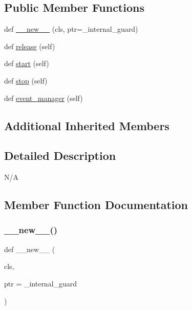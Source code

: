 \subsection*{Public Member Functions}
\begin{DoxyCompactItemize}
\item 
def \hyperlink{classvlc_1_1_renderer_discoverer_a2ed91930af7622fec54ade5b2d4b2315}{\+\_\+\+\_\+new\+\_\+\+\_\+} (cls, ptr=\+\_\+internal\+\_\+guard)
\item 
def \hyperlink{classvlc_1_1_renderer_discoverer_a4cd51e19135e5ad4a19eae3ea9c60537}{release} (self)
\item 
def \hyperlink{classvlc_1_1_renderer_discoverer_af1af6ddf04f00f958949618f79c33b82}{start} (self)
\item 
def \hyperlink{classvlc_1_1_renderer_discoverer_a26ca7c1c7fcdd35378e7be97727047a6}{stop} (self)
\item 
def \hyperlink{classvlc_1_1_renderer_discoverer_ab7c92812cd259eb8e4e4fd292b81bfaa}{event\+\_\+manager} (self)
\end{DoxyCompactItemize}
\subsection*{Additional Inherited Members}


\subsection{Detailed Description}
\begin{DoxyVerb}N/A
\end{DoxyVerb}
 

\subsection{Member Function Documentation}
\mbox{\label{classvlc_1_1_renderer_discoverer_a2ed91930af7622fec54ade5b2d4b2315}} 
\subsubsection{\texorpdfstring{\+\_\+\+\_\+new\+\_\+\+\_\+()}{\_\_new\_\_()}}
{\footnotesize\ttfamily def \+\_\+\+\_\+new\+\_\+\+\_\+ (\begin{DoxyParamCaption}\item[{}]{cls,  }\item[{}]{ptr = {\ttfamily \+\_\+internal\+\_\+guard} }\end{DoxyParamCaption})}

